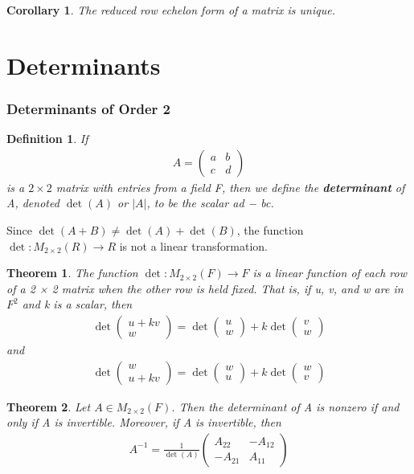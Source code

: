 \documentclass{article}
\newcommand{\bd}[1]{\textbf{#1}}
\newcommand*\bpmat[0]{\begin{pmatrix}}
\newcommand*\epmat[0]{\end{pmatrix}}
\theoremstyle{plain}
\newtheorem{theorem}{Theorem}[section]
\newtheorem*{corollary}{Corollary}
\newtheorem*{definition1}{Definition}
\theoremstyle{plain} %
\begin{document}
\begin{corollary}
  The reduced row echelon form of a matrix is unique.
\end{corollary}

\section{Determinants}

\subsubsection{Determinants of Order 2}

\begin{definition1}
  If 
\begin{align*}
  A=\bpmat a&b\\c&d\epmat
\end{align*}
is a $2\times 2$ matrix with entries from a field F, then we define the \bd{determinant} of A, denoted $\det(A)$ or $|A|$, to be the scalar ad − bc.
\end{definition1}

Since $\det(A + B) \neq \det(A) + \det(B)$, the function $\det: M_{2\times 2}(R) \to R$ is not a linear transformation.

\begin{theorem}
  The function $\det: M_{2\times 2}(F) \to F$ is a linear function of each row of a 2 × 2 matrix when the other row is held fixed. That is, if u, v, and w are in $F^2$ and k is a scalar, then
  \begin{align*}
    \det\bpmat u+kv\\w\epmat =\det\bpmat u\\w\epmat +k\det \bpmat v\\w\epmat
  \end{align*}
  and
  \begin{align*}
    \det\bpmat w\\u+kv\epmat = \det\bpmat w\\u\epmat +k\det\bpmat w\\v\epmat
  \end{align*}
\end{theorem}

\begin{theorem}
  Let $A \in M_{2\times 2}(F)$. Then the determinant of A is nonzero if and only if A is invertible. Moreover, if A is invertible, then
  \begin{align*}
    A^{-1}=\frac{1}{\det(A)}\bpmat A_{22}&-A_{12}\\-A_{21}&A_{11}\epmat
  \end{align*}
\end{theorem}
\end{document}
